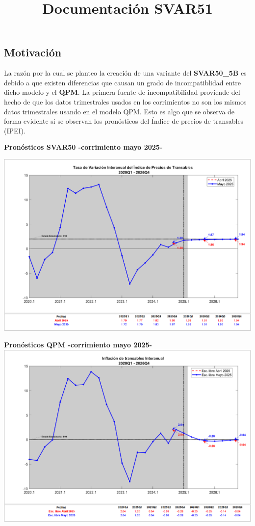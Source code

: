 \documentclass[
  letterpaper,
  DIV=11,
  numbers=noendperiod]{scrartcl}
\title{Documentación SVAR51}
\author{}
\date{}
\begin{document}
\maketitle


\subsection{Motivación}\label{motivaciuxf3n}

La razón por la cual se planteo la creación de una variante del
\textbf{SVAR50\_5B} es debido a que existen diferencias que causan un
grado de incompatiblidad entre dicho modelo y el \textbf{QPM}. La
primera fuente de incompatibilidad proviende del hecho de que los datos
trimestrales usados en los corrimientos no son los mismos datos
trimestrales usando en el modelo QPM. Esto es algo que se observa de
forma evidente si se observan los pronósticos del Índice de precios de
transables (IPEI).

\textbf{Pronósticos SVAR50 -corrimiento mayo 2025-}

\includegraphics[width=9.375in,height=\textheight,keepaspectratio]{plots/d4_ln_ipei_short.png}

\textbf{Pronósticos QPM -corrimiento mayo 2025-}
\includegraphics[width=9.375in,height=\textheight,keepaspectratio]{plots/D4L_IPEI_short.png}
\end{document}
